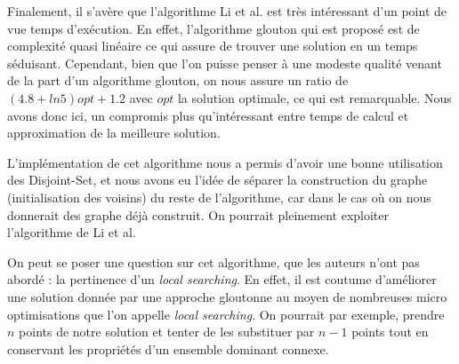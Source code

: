 
Finalement, il s'avère que l'algorithme Li et al. est très intéressant d'un point de vue temps d'exécution. En effet, l'algorithme glouton qui est proposé est de complexité quasi linéaire ce qui assure de trouver une solution en un temps séduisant. Cependant, bien que l'on puisse penser à une modeste qualité venant de la part d'un algorithme glouton, on nous assure un ratio de $(4.8+ln5)opt+1.2$ avec $opt$ la solution optimale, ce qui est remarquable. Nous avons donc ici, un compromis plus qu'intéressant entre temps de calcul et approximation de la meilleure solution.

L'implémentation de cet algorithme nous a permis d'avoir une bonne utilisation des Disjoint-Set, et nous avons eu l'idée de séparer la construction du graphe (initialisation des voisins) du reste de l'algorithme, car dans le cas où on nous donnerait des graphe déjà construit. On pourrait pleinement exploiter l'algorithme de Li et al.

On peut se poser une question sur cet algorithme, que les auteurs n'ont pas abordé : la pertinence d'un \textit{local searching}. En effet, il est coutume d'améliorer une solution donnée par une approche gloutonne au moyen de nombreuses micro optimisations que l'on appelle \textit{local searching}. On pourrait par exemple, prendre $n$ points de notre solution et tenter de les substituer par $n-1$ points tout en conservant les propriétés d'un ensemble dominant connexe.